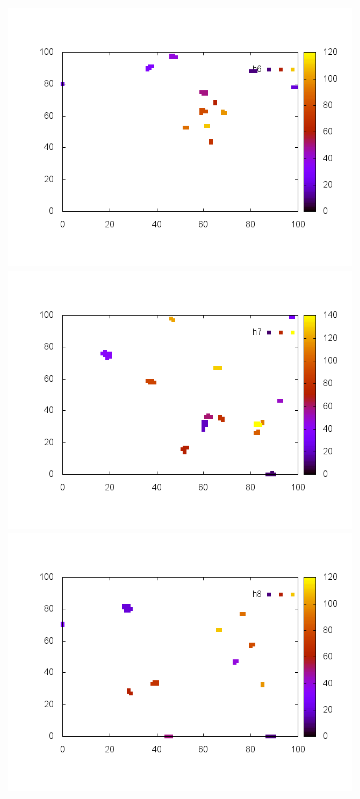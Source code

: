 \documentclass[10pt,a4paper]{article}
\begin{document}
\begin{figure}
\begin{subfigure}[b]{1\textwidth}
\includegraphics[scale=.3]{./img/SCC_Stable3/cut99p/6.png}
\includegraphics[scale=.3]{./img/SCC_Stable3/cut99p/7.png}
\includegraphics[scale=.3]{./img/SCC_Stable3/cut99p/8.png}

\end{subfigure}
\end{figure}
\end{document}

